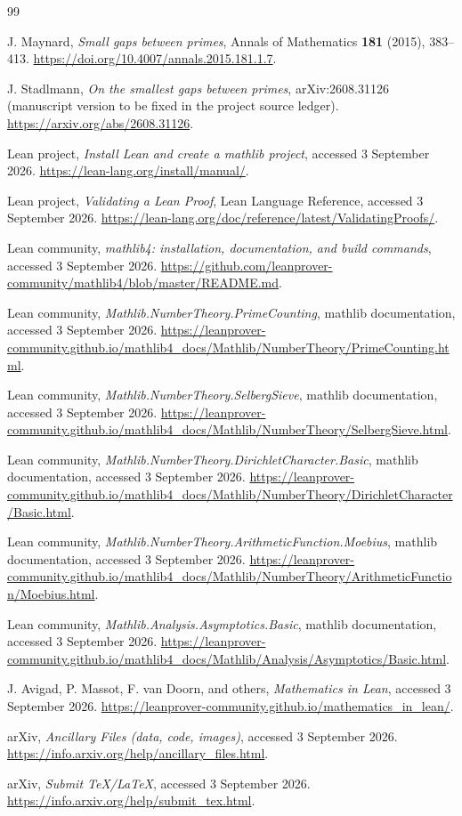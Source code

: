 \documentclass[11pt]{article}
\begin{document}
\begin{thebibliography}{99}

J. Maynard,
\emph{Small gaps between primes},
Annals of Mathematics \textbf{181} (2015), 383--413.
\url{https://doi.org/10.4007/annals.2015.181.1.7}.

J. Stadlmann,
\emph{On the smallest gaps between primes},
arXiv:2608.31126 (manuscript version to be fixed in the project source ledger).
\url{https://arxiv.org/abs/2608.31126}.

Lean project,
\emph{Install Lean and create a mathlib project},
accessed 3 September 2026.
\url{https://lean-lang.org/install/manual/}.

Lean project,
\emph{Validating a Lean Proof},
Lean Language Reference, accessed 3 September 2026.
\url{https://lean-lang.org/doc/reference/latest/ValidatingProofs/}.

Lean community,
\emph{mathlib4: installation, documentation, and build commands},
accessed 3 September 2026.
\url{https://github.com/leanprover-community/mathlib4/blob/master/README.md}.

Lean community,
\emph{Mathlib.NumberTheory.PrimeCounting},
mathlib documentation, accessed 3 September 2026.
\url{https://leanprover-community.github.io/mathlib4_docs/Mathlib/NumberTheory/PrimeCounting.html}.

Lean community,
\emph{Mathlib.NumberTheory.SelbergSieve},
mathlib documentation, accessed 3 September 2026.
\url{https://leanprover-community.github.io/mathlib4_docs/Mathlib/NumberTheory/SelbergSieve.html}.

Lean community,
\emph{Mathlib.NumberTheory.DirichletCharacter.Basic},
mathlib documentation, accessed 3 September 2026.
\url{https://leanprover-community.github.io/mathlib4_docs/Mathlib/NumberTheory/DirichletCharacter/Basic.html}.

Lean community,
\emph{Mathlib.NumberTheory.ArithmeticFunction.Moebius},
mathlib documentation, accessed 3 September 2026.
\url{https://leanprover-community.github.io/mathlib4_docs/Mathlib/NumberTheory/ArithmeticFunction/Moebius.html}.

Lean community,
\emph{Mathlib.Analysis.Asymptotics.Basic},
mathlib documentation, accessed 3 September 2026.
\url{https://leanprover-community.github.io/mathlib4_docs/Mathlib/Analysis/Asymptotics/Basic.html}.

J. Avigad, P. Massot, F. van Doorn, and others,
\emph{Mathematics in Lean}, accessed 3 September 2026.
\url{https://leanprover-community.github.io/mathematics_in_lean/}.

arXiv,
\emph{Ancillary Files (data, code, images)},
accessed 3 September 2026.
\url{https://info.arxiv.org/help/ancillary_files.html}.

arXiv,
\emph{Submit TeX/LaTeX},
accessed 3 September 2026.
\url{https://info.arxiv.org/help/submit_tex.html}.

\end{thebibliography}
\end{document}

